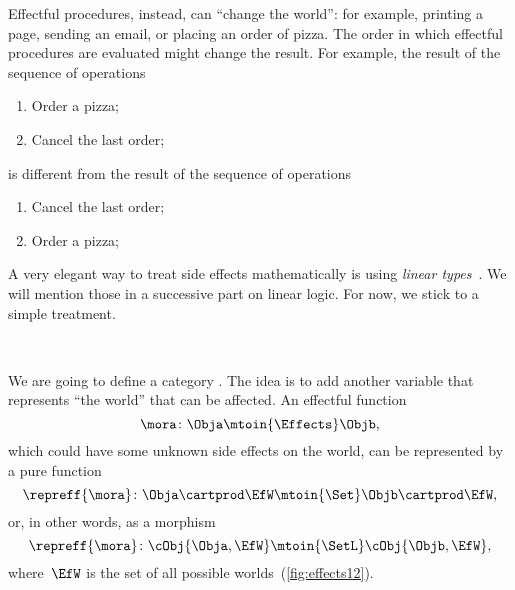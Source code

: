 Effectful procedures, instead, can ``change the world'': for example, printing a page, sending an email, or placing an order of pizza.
The order in which effectful procedures are evaluated might change the result.
For example, the result of the sequence of operations
%
\begin{enumerate}
    \item Order a pizza;
    \item Cancel the last order;
\end{enumerate}
%
is different from the result of the sequence of operations
%
\begin{enumerate}
    \item Cancel the last order;
    \item Order a pizza;
\end{enumerate}

A very elegant way to treat side effects mathematically is using \emph{linear types}~\cite{Wadler90lineartypes}.
We will mention those in a successive part on linear logic.
For now, we stick to a simple treatment.

\begin{marginfigure}
    \centering
    \\
    \caption{}
    \label{fig:effects12}
\end{marginfigure}

We are going to define a category \Effects.
The idea is to add another variable that represents ``the world'' that can be affected.
An effectful function
%
\begin{equation}\label{eq:Eff-morphism}
    \mora\colon \Obja \mtoin{\Effects} \Objb,
\end{equation}
%
which could have some unknown side effects on the world, can be represented by a pure function
\begin{equation}
    \repreff{\mora}\colon \Obja \cartprod \EfW \mtoin{\Set} \Objb \cartprod \EfW,
\end{equation}\label{eq:Eff-rep-morphism-Set}
or, in other words, as a morphism
\begin{equation}\label{eq:Eff-rep-morphism-SetL}
    \repreff{\mora}\colon \cObj{\Obja,\EfW} \mtoin{\SetL} \cObj{\Objb, \EfW},
\end{equation}
%
where~$\EfW$ is the set of all possible worlds~(\cref{fig:effects12}).


